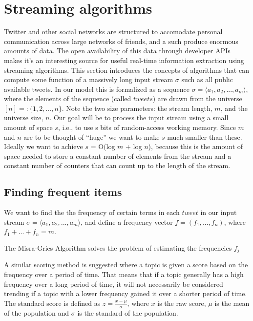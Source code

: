 \section{Streaming algorithms}\label{related work}
Twitter and other social networks are structured to accomodate personal communication across large networks of friends, and a such produce enormous amounts of data. The open availability of this data through developer APIs makes it's an interesting source for useful real-time information extraction using streaming algorithms. \cite{genderprediction} 
This section introduces the concepts of algorithms that can compute some function of a massively long input stream $\sigma$ such as all public available tweets. In our model this is formalized as a sequence $\sigma = \langle a_{1}, a_{2},...,a_{m}\rangle $, where the elements of the sequence (called $tweets$) are drawn from the universe $[n] =: \{1, 2,..., n\}$. Note the two size parameters: the stream length, $m$, and the universe size, $n$.
Our goal will be to process the input stream using a small amount of space $s$, i.e., to use s bits of random-access working memory. Since $m$ and $n$ are to be thought of ``huge'' we want to make $s$ much smaller than these. Ideally we want to achieve $s$ = O(log $m$ + log $n$), because this is the amount of space needed to store a constant number of elements from the stream and a constant number of counters that can count up to the length of the stream. \cite{Amit}

\subsection{Finding frequent items}
We want to find the the frequency of certain terms in each $tweet$ in our input stream $\sigma = \langle a_{1}, a_{2},...,a_{m}\rangle$, and define a frequency vector $f = (f_{1},...,f_{n})$, where $f_{1} + ... + f_{n} = m$. 

The Misra-Gries Algorithm solves the problem of estimating the frequencies $f_{j}$ \cite{Amit}

A similar scoring method is suggested where a topic is given a score based on the frequency over a period of time. That means that if a topic generally has a high frequency over a long period of time, it will not necessarily be considered trending if a topic with a lower frequency gained it over a shorter period of time. The standard score is defined as $z = \frac{x - \mu}{\sigma}$, where $x$ is the raw score, $\mu$ is the mean of the population and $\sigma$ is the standard of the population.


